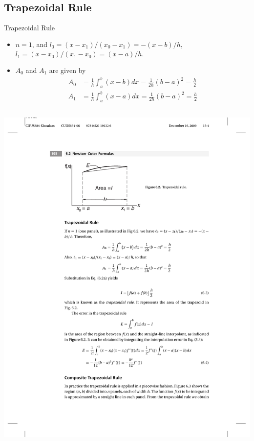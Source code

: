 \documentclass{beamer}
\newcommand{\beforeverb}{\footnotesize}
\newcommand{\afterverb}{\normalsize}
\begin{document}
\subsection[Trapezoidal Rule]{Trapezoidal Rule}
\begin{frame}{Trapezoidal Rule}

\begin{itemize}
\item $n=1$, and $l_0=(x-x_1)/(x_0-x_1)=-(x-b)/h$,  $l_1=(x-x_0)/(x_1-x_0)=(x-a)/h$.
\item $A_0$ and $A_1$ are given by
\beforeverb
\begin{align*}
A_0&=\frac{1}{h} \int_a^b (x-b) dx =\frac{1}{2h}(b-a)^2=\frac{h}{2}\\
A_1&=\frac{1}{h} \int_a^b (x-a) dx =\frac{1}{2h}(b-a)^2=\frac{h}{2}
\end{align*}
\afterverb
\end{itemize}
\begin{columns}
\begin{column}{0.3\textwidth}
\centerline{\includegraphics[width=\textwidth]{Lec12_Fig2}}
\end{column}


\end{columns}
\end{frame}
\end{document}
